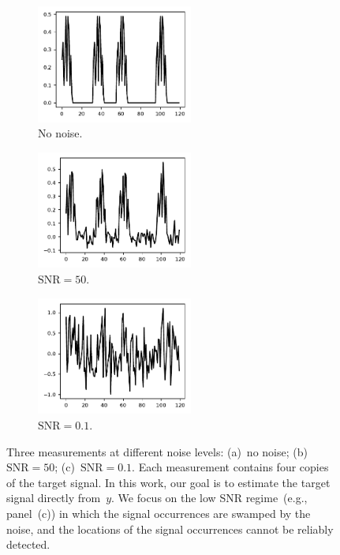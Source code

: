 \documentclass{article}
\begin{document}
\begin{figure}[!tb]
	\begin{subfigure}[ht]{0.33\textwidth}
		\centering
		\includegraphics[width=\columnwidth, height=110pt]{figures/y_clean.pdf}
		\caption{No noise.}
	\end{subfigure}
	\hfill
	\begin{subfigure}[ht]{0.33\textwidth}
		\centering
		\includegraphics[width=\columnwidth, height=110pt]{figures/y_SNR50.pdf}
		\caption{$\text{SNR} = 50$.}
	\end{subfigure}
	\hfill
	\begin{subfigure}[ht]{0.33\textwidth}
		\centering
		\includegraphics[width=\columnwidth, height=110pt]{figures/y_SNR01.pdf}
		\caption{$\text{SNR} = 0.1$.}
	\end{subfigure}
	\caption{Three measurements at different noise levels: (a)~no noise; (b)~\mbox{$\text{SNR} = 50$}; (c)~\mbox{$\text{SNR} = 0.1$}. Each measurement contains four copies of the target signal. In this work, our goal is to estimate the target signal directly from~$y$. We focus on the low SNR regime~(e.g., panel~(c)) in which the signal occurrences are swamped by the noise, and the locations of the signal occurrences cannot be reliably detected.}
\label{fig:measurements}
\end{figure}
\end{document}
